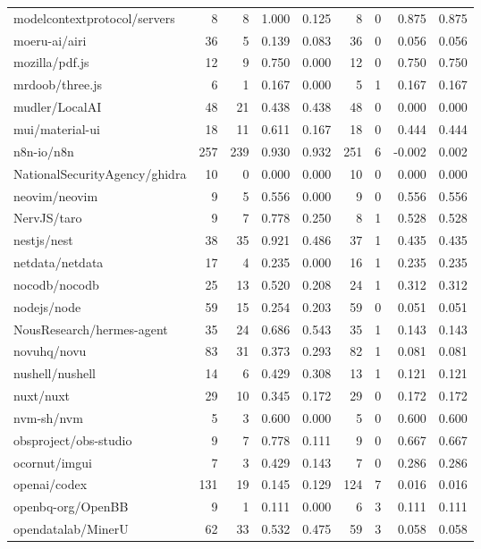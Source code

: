\begin{tabular}{lrrrrrrrr}
modelcontextprotocol/servers & 8 & 8 & 1.000 & 0.125 & 8 & 0 & 0.875 & 0.875 \\
moeru-ai/airi & 36 & 5 & 0.139 & 0.083 & 36 & 0 & 0.056 & 0.056 \\
mozilla/pdf.js & 12 & 9 & 0.750 & 0.000 & 12 & 0 & 0.750 & 0.750 \\
mrdoob/three.js & 6 & 1 & 0.167 & 0.000 & 5 & 1 & 0.167 & 0.167 \\
mudler/LocalAI & 48 & 21 & 0.438 & 0.438 & 48 & 0 & 0.000 & 0.000 \\
mui/material-ui & 18 & 11 & 0.611 & 0.167 & 18 & 0 & 0.444 & 0.444 \\
n8n-io/n8n & 257 & 239 & 0.930 & 0.932 & 251 & 6 & -0.002 & 0.002 \\
NationalSecurityAgency/ghidra & 10 & 0 & 0.000 & 0.000 & 10 & 0 & 0.000 & 0.000 \\
neovim/neovim & 9 & 5 & 0.556 & 0.000 & 9 & 0 & 0.556 & 0.556 \\
NervJS/taro & 9 & 7 & 0.778 & 0.250 & 8 & 1 & 0.528 & 0.528 \\
nestjs/nest & 38 & 35 & 0.921 & 0.486 & 37 & 1 & 0.435 & 0.435 \\
netdata/netdata & 17 & 4 & 0.235 & 0.000 & 16 & 1 & 0.235 & 0.235 \\
nocodb/nocodb & 25 & 13 & 0.520 & 0.208 & 24 & 1 & 0.312 & 0.312 \\
nodejs/node & 59 & 15 & 0.254 & 0.203 & 59 & 0 & 0.051 & 0.051 \\
NousResearch/hermes-agent & 35 & 24 & 0.686 & 0.543 & 35 & 1 & 0.143 & 0.143 \\
novuhq/novu & 83 & 31 & 0.373 & 0.293 & 82 & 1 & 0.081 & 0.081 \\
nushell/nushell & 14 & 6 & 0.429 & 0.308 & 13 & 1 & 0.121 & 0.121 \\
nuxt/nuxt & 29 & 10 & 0.345 & 0.172 & 29 & 0 & 0.172 & 0.172 \\
nvm-sh/nvm & 5 & 3 & 0.600 & 0.000 & 5 & 0 & 0.600 & 0.600 \\
obsproject/obs-studio & 9 & 7 & 0.778 & 0.111 & 9 & 0 & 0.667 & 0.667 \\
ocornut/imgui & 7 & 3 & 0.429 & 0.143 & 7 & 0 & 0.286 & 0.286 \\
openai/codex & 131 & 19 & 0.145 & 0.129 & 124 & 7 & 0.016 & 0.016 \\
openbq-org/OpenBB & 9 & 1 & 0.111 & 0.000 & 6 & 3 & 0.111 & 0.111 \\
opendatalab/MinerU & 62 & 33 & 0.532 & 0.475 & 59 & 3 & 0.058 & 0.058 \\

\end{tabular}
